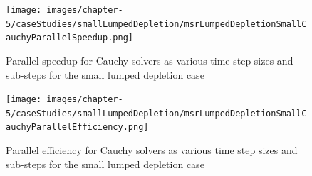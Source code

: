 \clearpage

\begin{figure}[p]
    \centering
    \texttt{[image: images/chapter-5/caseStudies/smallLumpedDepletion/msrLumpedDepletionSmallCauchyParallelSpeedup.png]}
    \caption{Parallel speedup for Cauchy solvers as various time step sizes and sub-steps for the small lumped depletion case}
    \label{fig:small_lumped_depletion_cauchy_speedup}
\end{figure}

\clearpage

\begin{figure}[p]
    \centering
    \texttt{[image: images/chapter-5/caseStudies/smallLumpedDepletion/msrLumpedDepletionSmallCauchyParallelEfficiency.png]}
    \caption{Parallel efficiency for Cauchy solvers as various time step sizes and sub-steps for the small lumped depletion case}
    \label{fig:small_lumped_depletion_cauchy_parallel_eff}
\end{figure}

\clearpage



